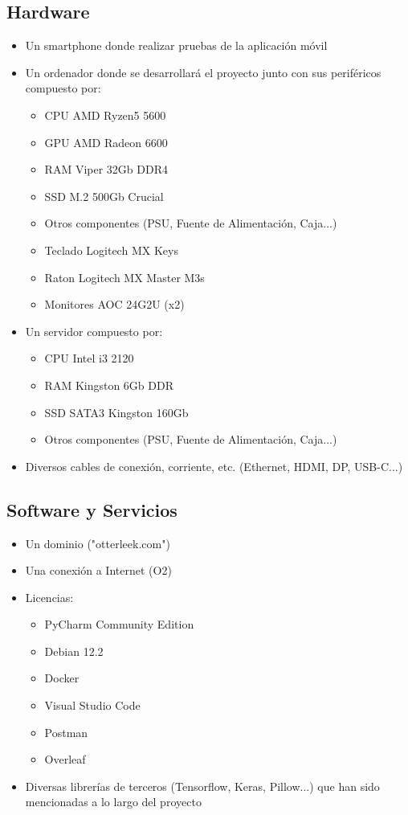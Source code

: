 \documentclass{article}
\begin{document}
\subsection{Hardware}
\begin{itemize}
	\item Un smartphone donde realizar pruebas de la aplicación móvil
	\item Un ordenador donde se desarrollará el proyecto junto con sus periféricos compuesto por:
	\begin{itemize}
    	\item CPU AMD Ryzen5 5600
    	\item GPU AMD Radeon 6600
    	\item RAM Viper 32Gb DDR4
    	\item SSD M.2 500Gb Crucial
    	\item Otros componentes (PSU, Fuente de Alimentación, Caja...)
    	\item Teclado Logitech MX Keys
    	\item Raton Logitech MX Master M3s
    	\item Monitores AOC 24G2U (x2)
	\end{itemize}
	\item Un servidor compuesto por:
	\begin{itemize}
    	\item CPU Intel i3 2120
    	\item RAM Kingston 6Gb DDR
    	\item SSD SATA3 Kingston 160Gb
    	\item Otros componentes (PSU, Fuente de Alimentación, Caja...)
	\end{itemize}
	\item Diversos cables de conexión, corriente, etc. (Ethernet, HDMI, DP, USB-C...)
\end{itemize}

\subsection{Software y Servicios}
\begin{itemize}
	\item Un dominio ("otterleek.com")
	\item Una conexión a Internet (O2)
	\item Licencias:
	\begin{itemize}
    	\item PyCharm Community Edition
    	\item Debian 12.2
    	\item Docker
    	\item Visual Studio Code
    	\item Postman
    	\item Overleaf
	\end{itemize}
	\item Diversas librerías de terceros (Tensorflow, Keras, Pillow...) que han sido mencionadas a lo largo del proyecto
\end{itemize}
\newpage
\end{document}
